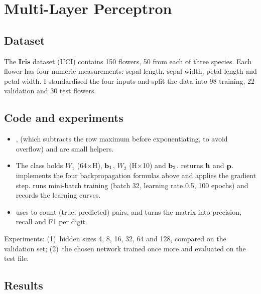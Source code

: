 \chapter{Multi-Layer Perceptron}


\section{Dataset}
The \textbf{Iris} dataset (UCI) contains 150 flowers, 50 from each of three species. Each flower has
four numeric measurements: sepal length, sepal width, petal length and petal width. I standardised the
four inputs and split the data into 98 training, 22 validation and 30 test flowers.

\section{Code and experiments}
\begin{itemize}
\item {},  (which subtracts the row maximum before exponentiating, to avoid
      overflow) and  are small helpers.
\item The  class holds $W_1$ (64×H), $\mathbf{b}_1$, $W_2$ (H×10) and $\mathbf{b}_2$.
       returns $\mathbf{h}$ and $\mathbf{p}$.  implements the four
      backpropagation formulas above and applies the gradient step.  runs mini-batch training
      (batch 32, learning rate 0.5, 100 epochs) and records the learning curves.
\item {} uses  to count (true, predicted) pairs, and
       turns the matrix into precision, recall and F1 per digit.
\end{itemize}
\noindent Experiments: (1)~hidden sizes 4, 8, 16, 32, 64 and 128, compared on the validation set;
(2)~the chosen network trained once more and evaluated on the test file.

\section{Results}

